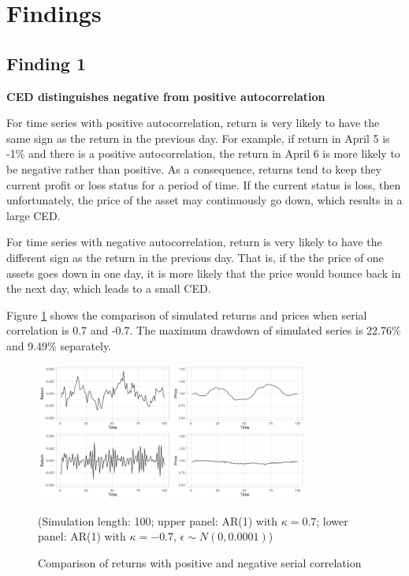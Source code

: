 \documentclass[11pt]{article}
\begin{document}
\section{Findings}  %

\subsection{Finding 1}

\textbf{CED distinguishes negative from positive autocorrelation}

For time series with positive autocorrelation, return is very likely to have the same sign as the return in the previous day. For example, if return in April 5 is -1\% and there is a positive autocorrelation, the return in April 6 is more likely to be negative rather than positive. As a consequence, returns tend to keep they current profit or loss status for a period of time. If the current status is loss, then unfortunately, the price of the asset may continuously go down, which results in a large CED.

For time series with negative autocorrelation, return is very likely to have the different sign as the return in the previous day. That is, if the the price of one assets goes down in one day, it is more likely that the price would bounce back in the next day, which leads to a small CED. 

Figure \ref{fig:Comparison_pos_neg_autocorrelation} shows the comparison of simulated returns and prices when serial correlation is 0.7 and -0.7. The maximum drawdown of simulated series is 22.76\% and 9.49\% separately. 

\begin{figure}[H]
\centering
\includegraphics[width = 0.8\textwidth]{../figures/simulation/Comparison_pos_neg_autocorrelation}
\caption{Comparison of returns with positive and negative serial correlation}
(Simulation length: 100; upper panel: AR(1) with $\kappa=0.7$; lower panel: AR(1) with $\kappa=-0.7$, $\epsilon\sim N(0, 0.0001)$)
\label{fig:Comparison_pos_neg_autocorrelation}
\end{figure}
\end{document}
